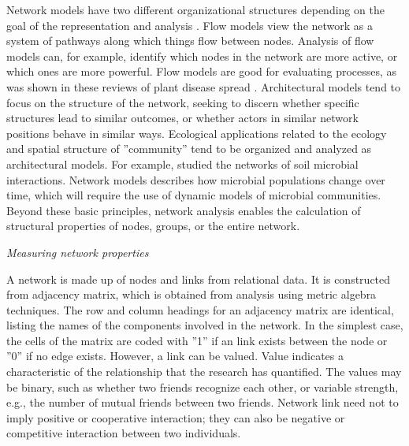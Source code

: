 Network models have two different organizational structures depending on the goal of the representation and analysis . Flow models view the network as a system of pathways along which things flow between nodes. Analysis of flow models can, for example, identify which nodes in the network are more active, or which ones are more powerful. Flow models are good for evaluating processes, as was shown in these reviews of plant disease spread . Architectural models tend to focus on the structure of the network, seeking to discern whether specific structures lead to similar outcomes, or whether actors in similar network positions behave in similar ways. Ecological applications related to the ecology and spatial structure of ''community'' tend to be organized and analyzed as architectural models. For example,  studied the networks of soil microbial interactions. Network models describes how microbial populations change over time, which will require the use of dynamic models of microbial communities. Beyond these basic principles, network analysis enables the calculation of structural properties of nodes, groups, or the entire network.

\textit{Measuring network properties}


A network is made up of nodes and links from relational data. It is constructed from adjacency matrix, which is obtained from analysis using metric algebra techniques. The row and column headings for an adjacency matrix are identical, listing the names of the components involved in the network. In the simplest case, the cells of the matrix are coded with ''1'' if an link exists between the node or ''0'' if no edge exists. However, a link can be valued. Value indicates a characteristic of the relationship that the research has quantified. The values may be binary, such as whether two friends recognize each other, or variable strength, e.g., the number of mutual friends between two friends. Network link need not to imply positive or cooperative interaction; they can also be negative or competitive interaction between two individuals.    



